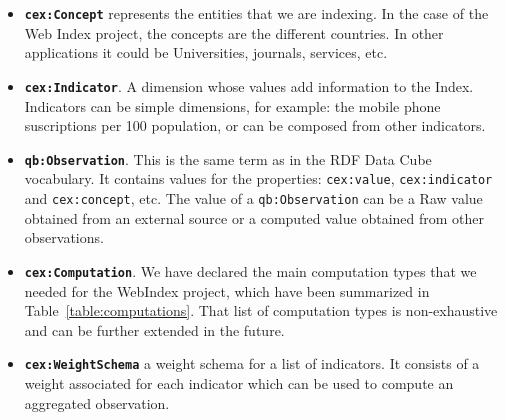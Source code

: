 \documentclass{acm_proc_article-sp}
\begin{document}
\begin{itemize}
\item\textbf{\lstinline|cex:Concept|} represents the entities that we are
indexing.
In the case of the Web Index project, the concepts are the different countries.
In other applications it could be Universities, journals, services, etc.

\item\textbf{\lstinline|cex:Indicator|}. A dimension whose values add
information to the Index.
Indicators can be simple dimensions, for example: the mobile phone
suscriptions per 100 population, or can be composed from other
indicators. 

\item\textbf{\lstinline|qb:Observation|}. This is the same term as in the 
RDF Data Cube vocabulary. It contains values for the
properties: \lstinline|cex:value|, \lstinline|cex:indicator| 
and \lstinline|cex:concept|, etc. 
The value of a \lstinline|qb:Observation| can be a Raw value
   obtained from an external source or a computed value obtained from other
   observations.

\item\textbf{\lstinline|cex:Computation|}. We have declared the main computation
types that we needed for the WebIndex project, which have been summarized in
Table~\ref{table:computations}. That list of computation types is non-exhaustive
and can be further extended in the future. 

\item\textbf{\lstinline|cex:WeightSchema|} a weight schema for a list of
indicators. It consists of a weight associated for each indicator which can be
used to compute an aggregated observation.

\end{itemize}
\end{document}
